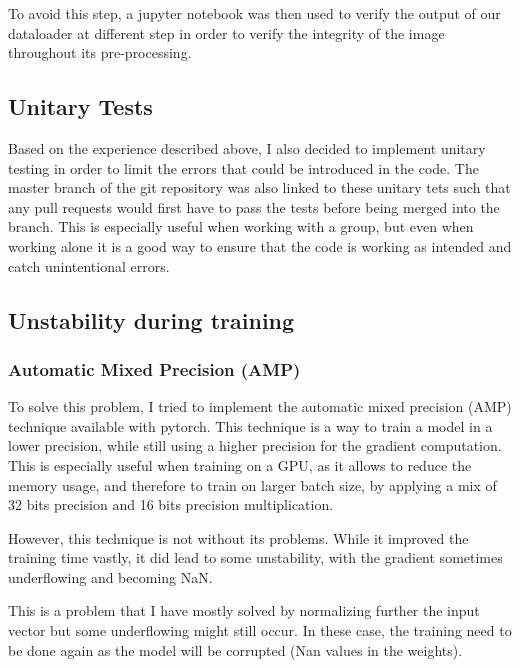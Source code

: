 \documentclass[11pt]{article}
\begin{document}
        To avoid this step, a jupyter notebook was then used to verify the output of our dataloader at different step in order to verify the integrity of the image
        throughout its pre-processing.

    \subsection{Unitary Tests}

            Based on the experience described above, I also decided to implement unitary testing in order to limit the errors
            that could be introduced in the code. The master branch of the git repository was also linked to these unitary tets such that
            any pull requests would first have to pass the tests before being merged into the branch. This is especially useful when working with a group,
            but even when working alone it is a good way to ensure that the code is working as intended and catch unintentional errors.


    \subsection{Unstability during training}

    \subsubsection{Automatic Mixed Precision (AMP)}

            To solve this problem, I tried to implement the automatic mixed precision (AMP) technique available with pytorch. This technique is a way to train a model in a lower precision, while still using a higher precision for the gradient computation.
            This is especially useful when training on a GPU, as it allows to reduce the memory usage, and therefore to train on larger batch size, by applying a mix
            of 32 bits precision and 16 bits precision multiplication.

            However, this technique is not without its problems. While it improved the training time vastly,
            it did lead to some unstability, with the gradient sometimes underflowing and becoming NaN.

            This is a problem that I have mostly solved by normalizing further the input vector but some
            underflowing might still occur. In these case, the training need to be done
            again as the model will be corrupted (Nan values in the weights).
\end{document}
